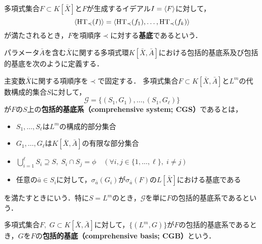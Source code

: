 \begin{definition}[\groebner{}基底]
	多項式集合$F \subset K[\bar{X}]$と$F$が生成するイデアル$I = \langle F \rangle$に対して，
	$$\langle \mathrm{HT}_\prec(I) \rangle = \langle \mathrm{HT}_\prec(f_1), \dots, \mathrm{HT}_\prec(f_k) \rangle$$
	が満たされるとき，$F$を項順序$\prec$に対する\textbf{\groebner{}基底}であるという．
\end{definition}
パラメータ$\bar{A}$を含む$\bar{X}$に関する多項式環$K[\bar{X}, \bar{A}]$における包括的\groebner{}基底系及び包括的\groebner{}基底を次のように定義する．
\nocite{鈴木晃2007グレブナー基底を用いた包括的グレブナー基底計算}
\begin{definition}
	主変数$\bar{X}$に関する項順序を$\prec$で固定する．
	多項式集合$F \subset K[\bar{X}, \bar{A}]$と$L^m$の代数構成的集合$S$に対して，
	$$\mathcal{G} = \{(S_1, G_1), \dots, (S_1, G_\ell)\}$$
	が$F$の$S$上の\textbf{包括的\groebner{}基底系（comprehensive \groebner{} system; CGS）}であるとは，
	\begin{itemize}
		\item $S_1, \dots, S_\ell$は$L^m$の構成的部分集合
		\item $G_1, \dots, G_\ell$は$K[\bar{X}, \bar{A}]$の有限な部分集合
		\item $\displaystyle \bigcup_{i=1}^{\ell} S_i \supseteq S, \; S_i \cap S_j = \phi \quad (\forall i,j \in \{ 1, \dots, \ell \}, \; i \ne j)$
		\item 任意の$\bar{a} \in S_i$に対して，$\sigma_{\bar{a}}(G_i)$が$\sigma_{\bar{a}}(F)$の$L[\bar{X}]$における\groebner{}基底である
	\end{itemize}
	を満たすときにいう．特に$S = L^m$のとき，$\mathcal{G}$を単に$F$の包括的\groebner{}基底系であるという．
\end{definition}

\begin{definition}
	多項式集合$F,\; G \subset K[\bar{X}, \bar{A}]$に対して，$\{(L^m, G)\}$が$F$の包括的\groebner{}基底系であるとき，$G$を$F$の\textbf{包括的\groebner{}基底（comprehensive \groebner{} basis; CGB）}という．
\end{definition}






